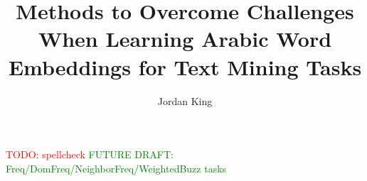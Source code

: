 \documentclass[12pt]{report}
\title{Methods to Overcome Challenges When Learning Arabic Word Embeddings for Text Mining Tasks}
\author{Jordan King}
\begin{document}
\maketitle   

\textcolor{red}{TODO: spellcheck}
\textcolor{green}{FUTURE DRAFT: Freq/DomFreq/NeighborFreq/WeightedBuzz tasks}



\tableofcontents
\listoffigures 
\listoftables  

\newpage
{}  %








% 
% 






% 

\end{document}
